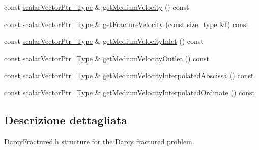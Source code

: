 \begin{DoxyCompactItemize}
\item 
const \hyperlink{Core_8h_ab09b6fa3c23db1b8c60456f8690c44a7}{scalar\-Vector\-Ptr\-\_\-\-Type} \& \hyperlink{classDarcyFractured_ade6f2f6ecf800c73e780b3d9f79f067e}{get\-Medium\-Velocity} () const 
\item 
const \hyperlink{Core_8h_ab09b6fa3c23db1b8c60456f8690c44a7}{scalar\-Vector\-Ptr\-\_\-\-Type} \& \hyperlink{classDarcyFractured_a7ea359d5998a00804db8fc1ae1f4739a}{get\-Fracture\-Velocity} (const size\-\_\-type \&f) const 
\item 
const \hyperlink{Core_8h_ab09b6fa3c23db1b8c60456f8690c44a7}{scalar\-Vector\-Ptr\-\_\-\-Type} \& \hyperlink{classDarcyFractured_a9fb24270b092546fde30248cde36df9d}{get\-Medium\-Velocity\-Inlet} () const 
\item 
const \hyperlink{Core_8h_ab09b6fa3c23db1b8c60456f8690c44a7}{scalar\-Vector\-Ptr\-\_\-\-Type} \& \hyperlink{classDarcyFractured_a9ebc45cc4f1754c9957f73d0cf13aecc}{get\-Medium\-Velocity\-Outlet} () const 
\item 
const \hyperlink{Core_8h_ab09b6fa3c23db1b8c60456f8690c44a7}{scalar\-Vector\-Ptr\-\_\-\-Type} \& \hyperlink{classDarcyFractured_ae81133fce605415de5dce1924bb1b37b}{get\-Medium\-Velocity\-Interpolated\-Abscissa} () const 
\item 
const \hyperlink{Core_8h_ab09b6fa3c23db1b8c60456f8690c44a7}{scalar\-Vector\-Ptr\-\_\-\-Type} \& \hyperlink{classDarcyFractured_a65a1b410dd4b193eb51798cf688f948c}{get\-Medium\-Velocity\-Interpolated\-Ordinate} () const 
\end{DoxyCompactItemize}


\subsection{Descrizione dettagliata}
\hyperlink{DarcyFractured_8h}{Darcy\-Fractured.\-h} structure for the Darcy fractured problem. 



